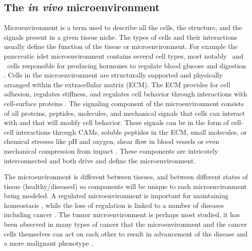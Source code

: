\subsection{The \textit{in vivo} microenvironment}
Microenvironment is a term used to describe all the cells, the structure, and the signals present in a given tissue niche. The types of cells and their interactions usually define the function of the tissue or microenvironment. For example the pancreatic islet microenvironment contains several cell types, most notably \textalpha \ and \textbeta \ cells responsible for producing hormones to regulate blood glucose and digestion \cite{Cabrera2006TheFunction.}. Cells in the microenvironment are structurally supported and physically arranged within the extracellular matrix (ECM). The ECM provides for cell adhesion, regulates stiffness, and regulates cell behavior through interactions with cell-surface proteins \cite{Stamenkovic2003, Meredith1993TheFactor.}. The signaling component of the microenvironment consists of all proteins, peptides, molecules, and mechanical signals that cells can interact with and that will modify cell behavior. These signals can be in the form of cell-cell interactions through CAMs, soluble peptides in the ECM, small molecules, or chemical stresses like pH and oxygen, shear flow in blood vessels or even mechanical compression from impact \cite{Kim2011b}. These components are intricately interconnected and both drive and define the microenvironment.

The microenvironment is different between tissues, and between different states of tissue (healthy/diseased) so components will be unique to each microenvironment being modeled. A regulated microenvironment is important for maintaining homeostasis \cite{Nie2013Microenvironment-dependentRepair}, while the loss of regulation is linked to a number of diseases including cancer \cite{Malizia1985TheLymphocytes., Yip2011, medema2011microenvironmental, Charbord1996EarlyMicroenvironment., Martin1995, Nie2013Microenvironment-dependentRepair}. The tumor microenvironment is perhaps most studied, it has been observed in many types of cancer that the microenvironment and the cancer cells themselves can act on each other to result in advancement of the disease and a more malignant phenotype \cite{Meads2008, Jun2006, Shain2001CellMDR., Seo2015}.

